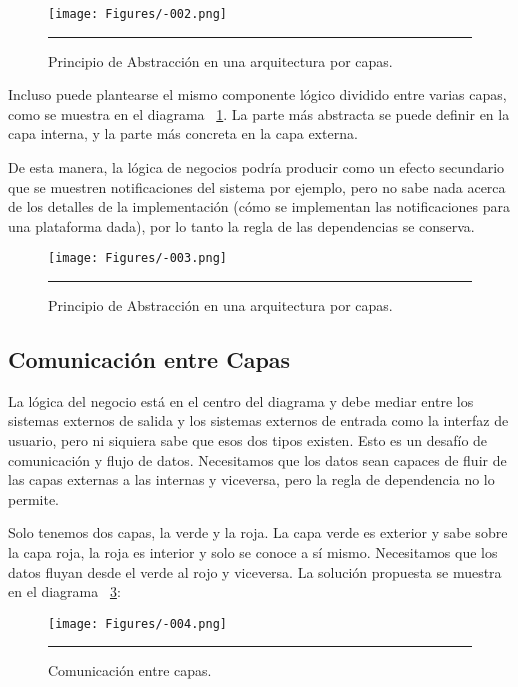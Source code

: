 \begin{figure}[htbp]
	\centering
	\texttt{[image: Figures/-002.png]}
	\rule{35em}{1pt}
	\caption[Abstraction Principle]{Principio de Abstracción en una arquitectura por capas.}
	\label{fig:C2_PA}
\end{figure}

Incluso puede plantearse el mismo componente lógico dividido entre varias capas, como se muestra en el diagrama ~\ref{fig:C2_PA}. La parte más abstracta se puede definir en la capa interna, y la parte más concreta en la capa externa.

De esta manera, la lógica de negocios podría producir como un efecto secundario que se muestren notificaciones del sistema por ejemplo, pero no sabe nada acerca de los detalles de la implementación (cómo se implementan las notificaciones para una plataforma dada), por lo tanto la regla de las dependencias se conserva.


\begin{figure}[htbp]
	\centering
	\texttt{[image: Figures/-003.png]}
	\rule{35em}{1pt}
	\caption[Abstraction Principle]{Principio de Abstracción en una arquitectura por capas.}
	\label{fig:C2_PA_02}
\end{figure}

\subsection{Comunicación entre Capas}
La lógica del negocio está en el centro del diagrama y debe mediar entre los sistemas externos de salida y los sistemas externos de entrada como la interfaz de usuario, pero ni siquiera sabe que esos dos tipos existen. Esto es un desafío  de comunicación y flujo de datos. Necesitamos que los datos sean capaces de fluir de las capas externas a las internas y viceversa, pero la regla de dependencia no lo permite.

Solo tenemos dos capas, la verde y la roja. La capa verde es exterior y sabe sobre la capa roja, la roja es interior y solo se conoce a sí mismo. Necesitamos que los datos fluyan desde el verde al rojo y viceversa. La solución propuesta se muestra en el diagrama ~\ref{fig:C2_CC_01}:

\begin{figure}[htbp]
	\centering
	\texttt{[image: Figures/-004.png]}
	\rule{35em}{1pt}
	\caption[Layer Communication]{Comunicación entre capas.}
	\label{fig:C2_CC_01}
\end{figure}

